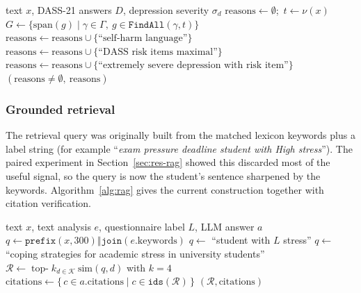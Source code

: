 \begin{algorithm}[H]
	\small
	\caption{$(\text{isCrisis}, \text{reasons}) \gets \texttt{CheckCrisis}(x, D, \sigma_d)$}
	\label{alg:crisis}
	\begin{algorithmic}[1]
		\Require text $x$, DASS-21 answers $D$, depression severity $\sigma_d$
		\State $\text{reasons} \gets \emptyset$;\ $t \gets \nu(x)$
		\State $G \gets \{\mathrm{span}(g) \mid \gamma \in \Gamma,\ g \in \texttt{FindAll}(\gamma, t)\}$
		\For{$(\kappa, \pi) \in \Pi$}
		\State $\text{reasons} \gets \text{reasons} \cup \{\text{``self-harm language''}\}$
		\EndIf
		\EndFor
		\EndFor
		\State $\text{reasons} \gets \text{reasons} \cup \{\text{``DASS risk items maximal''}\}$
		\State $\text{reasons} \gets \text{reasons} \cup \{\text{``extremely severe depression with risk item''}\}$
		\EndIf
		\State \Return $(\text{reasons} \neq \emptyset,\ \text{reasons})$
	\end{algorithmic}
\end{algorithm}

\subsubsection{Grounded retrieval}
The retrieval query was originally built from the matched lexicon keywords plus a label string (for example ``\textit{exam pressure deadline student with High stress}''). The paired experiment in Section~\ref{sec:res-rag} showed this discarded most of the useful signal, so the query is now the student's sentence sharpened by the keywords. Algorithm~\ref{alg:rag} gives the current construction together with citation verification.

\begin{algorithm}[H]
	\small
	\caption{$(\mathcal{R}, \text{citations}) \gets \texttt{GroundedRetrieve}(x, e, L, a)$}
	\label{alg:rag}
	\begin{algorithmic}[1]
		\Require text $x$, text analysis $e$, questionnaire label $L$, LLM answer $a$
		\State $q \gets \texttt{prefix}(x, 300) \mathbin\Vert \texttt{join}(e.\text{keywords})$ 
		\State $q \gets$ ``student with $L$ stress''
		\Else
		\State $q \gets$ ``coping strategies for academic stress in university students''
		\EndIf
		\State $\mathcal{R} \gets \operatorname{top-}k_{d \in \mathcal{K}}\ \mathrm{sim}(q, d)$ with $k = 4$ 
		\State $\text{citations} \gets \{\, c \in a.\text{citations} \mid c \in \texttt{ids}(\mathcal{R}) \,\}$ 
		\State \Return $(\mathcal{R}, \text{citations})$
	\end{algorithmic}
\end{algorithm}


